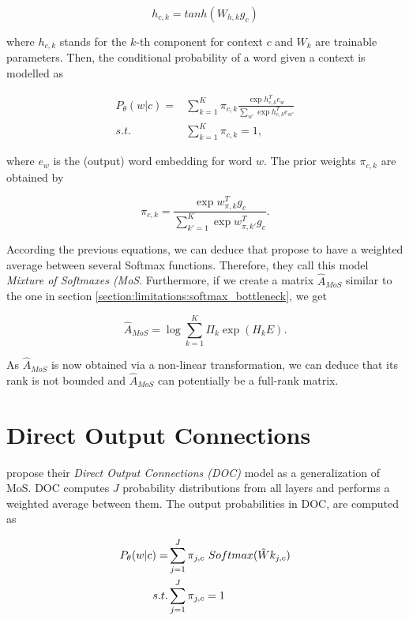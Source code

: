 \begin{displaymath}
    h_{c, k} = tanh(W_{h,k} g_c)
\end{displaymath}

where $ h_{c, k} $ stands for the $ k $-th component for context $ c $ and $ W_k $ are trainable parameters. Then, the conditional probability of a word given a context is modelled as

\begin{align*}
    P_\theta(w | c) = &\sum_{k=1}^K \pi_{c, k} \frac{\exp{h^T_{c, k} e_w}}{\sum_{w'} \exp{h^T_{c, k} e_{w'}}} \\
    s.t. &\sum_{k=1}^K \pi_{c, k} = 1,
\end{align*}

where $ e_w $ is the (output) word embedding for word $ w $. The prior weights $ \pi_{c, k} $ are obtained by

\begin{displaymath}
    \pi_{c, k} = \frac{\exp{w_{\pi, k}^T g_c}}{\sum_{k'=1}^K \exp{w_{\pi, k'}^T g_c}}.
\end{displaymath}

According the previous equations, we can deduce that \citet{yang2017breaking} propose to have a weighted average between several Softmax functions. Therefore, they call this model \emph{Mixture of Softmaxes (MoS}. Furthermore, if we create a matrix $ \hat{A}_{MoS} $ similar to the one in section \ref{section:limitations:softmax_bottleneck}, we get

\begin{displaymath}
    \hat{A}_{MoS} = \log \sum_{k=1}^K \Pi_k \exp (H_{k}E).
\end{displaymath}

As $ \hat{A}_{MoS} $ is now obtained via a non-linear transformation, we can deduce that its rank is not bounded and $ \hat{A}_{MoS} $ can potentially be a full-rank matrix.

\section{Direct Output Connections}
\label{section:related_work:doc}

\citet{takase2018direct} propose their \emph{Direct Output Connections (DOC)} model as a generalization of MoS. DOC computes $ J $ probability distributions from all layers and performs a weighted average between them. The output probabilities in DOC, are computed as

\begin{align*}
    P_\theta(w | c) = &\sum_{j=1}^J \pi_{j, c} \ Softmax(\Tilde{W}k_{j,c}) \\
    s.t. &\sum_{j=1}^J \pi_{j, c} = 1
\end{align*}


